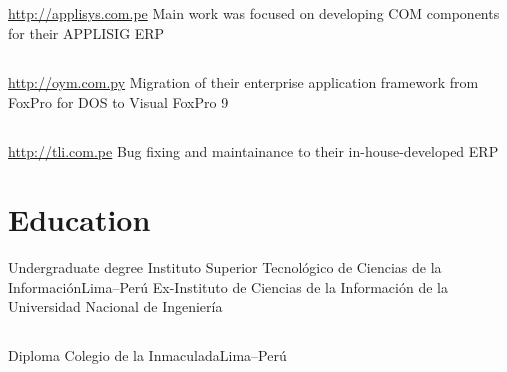 \documentclass[11pt,a4paper,english]{moderncv}
\begin{document}
\subsection{}

{
\url{http://applisys.com.pe}
\newline{}
Main work was focused on developing COM components for their APPLISIG ERP
}

\subsection{}

{
\url{http://oym.com.py}
\newline{}
Migration of their enterprise application framework from FoxPro for DOS to Visual FoxPro 9
}

\subsection{}

{
\url{http://tli.com.pe}
\newline{}
Bug fixing and maintainance to their in-house-developed ERP
}

\subsection{}

\section{Education}
    {Undergraduate degree}
    {Instituto Superior Tecnológico de Ciencias de la Información}{Lima--Perú}
    {}{Ex-Instituto de Ciencias de la Información de la Universidad Nacional de Ingeniería}

\subsection{}

    {Diploma}
    {Colegio de la Inmaculada}{Lima--Perú}
    {}{}

\subsection{}
    
\end{document}
